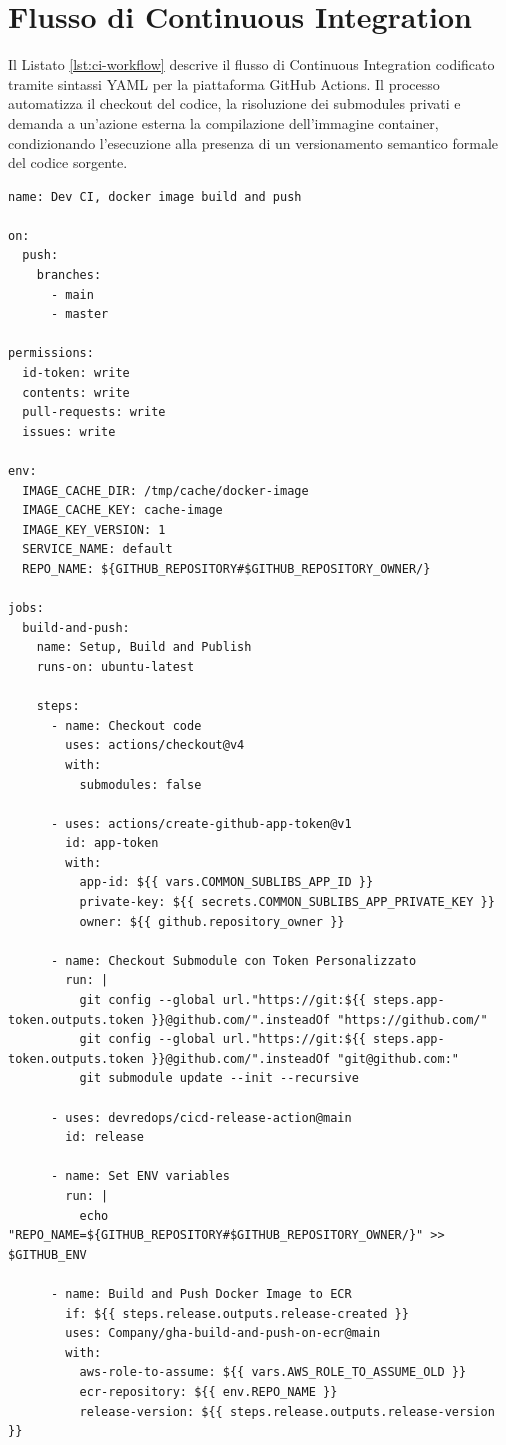 \section{Flusso di Continuous Integration}
Il Listato \ref{lst:ci-workflow} descrive il flusso di Continuous Integration codificato tramite sintassi YAML per la piattaforma GitHub Actions. Il processo automatizza il checkout del codice, la risoluzione dei submodules privati e demanda a un'azione esterna la compilazione dell'immagine container, condizionando l'esecuzione alla presenza di un versionamento semantico formale del codice sorgente.

\begin{lstlisting}[label={lst:ci-workflow}]
name: Dev CI, docker image build and push

on:
  push:
    branches:
      - main
      - master

permissions:
  id-token: write
  contents: write
  pull-requests: write
  issues: write

env:
  IMAGE_CACHE_DIR: /tmp/cache/docker-image
  IMAGE_CACHE_KEY: cache-image
  IMAGE_KEY_VERSION: 1
  SERVICE_NAME: default
  REPO_NAME: ${GITHUB_REPOSITORY#$GITHUB_REPOSITORY_OWNER/}

jobs:
  build-and-push:
    name: Setup, Build and Publish
    runs-on: ubuntu-latest

    steps:
      - name: Checkout code
        uses: actions/checkout@v4
        with:
          submodules: false
          
      - uses: actions/create-github-app-token@v1
        id: app-token
        with:
          app-id: ${{ vars.COMMON_SUBLIBS_APP_ID }}
          private-key: ${{ secrets.COMMON_SUBLIBS_APP_PRIVATE_KEY }}
          owner: ${{ github.repository_owner }}
          
      - name: Checkout Submodule con Token Personalizzato
        run: |
          git config --global url."https://git:${{ steps.app-token.outputs.token }}@github.com/".insteadOf "https://github.com/"
          git config --global url."https://git:${{ steps.app-token.outputs.token }}@github.com/".insteadOf "git@github.com:"
          git submodule update --init --recursive
          
      - uses: devredops/cicd-release-action@main
        id: release
        
      - name: Set ENV variables
        run: |
          echo "REPO_NAME=${GITHUB_REPOSITORY#$GITHUB_REPOSITORY_OWNER/}" >> $GITHUB_ENV
          
      - name: Build and Push Docker Image to ECR
        if: ${{ steps.release.outputs.release-created }}
        uses: Company/gha-build-and-push-on-ecr@main
        with:
          aws-role-to-assume: ${{ vars.AWS_ROLE_TO_ASSUME_OLD }}
          ecr-repository: ${{ env.REPO_NAME }}
          release-version: ${{ steps.release.outputs.release-version }}
          

\end{lstlisting}
